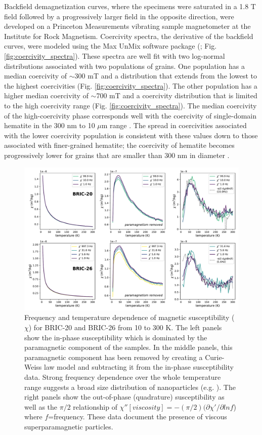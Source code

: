 \documentclass[draft]{agujournal2018}
\begin{document}
Backfield demagnetization curves, where the specimens were saturated in a 1.8 T field followed by a progressively larger field in the opposite direction, were developed on a Princeton Measurements vibrating sample magnetometer at the Institute for Rock Magnetism. Coercivity spectra, the derivative of the backfield curves, were modeled using the Max UnMix software package (\citealp{Maxbauer2016a}; Fig. \ref{fig:coercivity_spectra}). These spectra are well fit with two log-normal distributions associated with two populations of grains. One population has a median coercivity of $\sim$300 mT and a distribution that extends from the lowest to the highest coercivities (Fig. \ref{fig:coercivity_spectra}). The other population has a higher median coercivity of $\sim$700 mT and a coercivity distribution that is limited to the high coercivity range (Fig. \ref{fig:coercivity_spectra}). The median coercivity of the high-coercivity phase corresponds well with the coercivity of single-domain hematite in the 300 nm to 10 $\mu$m range \citep{Ozdemir2014a}. The spread in coercivities associated with the lower coercivity population is consistent with these values down to those associated with finer-grained hematite; the coercivity of hematite becomes progressively lower for grains that are smaller than 300 nm in diameter \citep{Ozdemir2014a}.

\begin{figure}[!ht]
\noindent\includegraphics[width=\textwidth]{figures/low_temp_ac}
\caption{\small{Frequency and temperature dependence of magnetic susceptibility ($\chi$) for BRIC-20 and BRIC-26 from 10 to 300 K. The left panels show the in-phase susceptibility which is dominated by the paramagnetic component of the samples. In the middle panels, this paramagnetic component has been removed by creating a Curie-Weiss law model and subtracting it from the in-phase susceptibility data. Strong frequency dependence over the whole temperature range suggests a broad size distribution of nanoparticles (e.g. \citealp{Jackson2012a}). The right panels show the out-of-phase (quadrature) susceptibility as well as the $\pi/2$ relationship of $\chi''[viscosity] = -(\pi/2)(\partial \chi'/\partial lnf$) where $f$=frequency. These data document the presence of viscous superparamagnetic particles.}}
\label{fig:low_temp_ac}
\end{figure}
\end{document}
